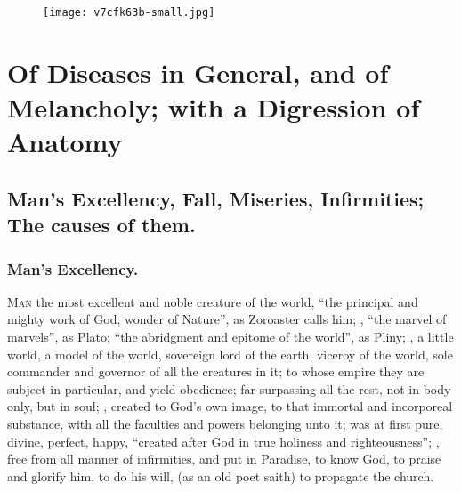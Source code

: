 \cleartoleftpage{}
\begin{figure}[p]
  \begingroup
  \centering
  \texttt{[image: v7cfk63b-small.jpg]}
  \label{fig:deathlooms}
\end{figure}
\clearpage{}
\chapter[Of Diseases and Melancholy]{Of Diseases in General, and of Melancholy; with a Digression of Anatomy}
\section[Man's Excellency, Fall, Miseries]{Man's Excellency, Fall, Miseries, Infirmities; The causes of them.}

\subsection{Man's Excellency.}

\lettrine[lines=4,findent=5pt,nindent=0pt]{M}{an} the most excellent and noble
creature of the world, \enquote{the principal and mighty work of God, wonder of
Nature}, as Zoroaster calls him; , \enquote{the
marvel of marvels}, as Plato; \enquote{the
abridgment and epitome of the world}, as Pliny;
, a little world, a model of the world,
sovereign lord of the earth, viceroy of the world, sole
commander and governor of all the creatures in it; to whose empire they are
subject in particular, and yield obedience; far surpassing all the rest, not in
body only, but in soul; ,
created to God's own image, to that
immortal and incorporeal substance, with all the faculties and powers belonging
unto it; was at first pure, divine, perfect, happy,
\enquote{created after God in true holiness and righteousness};
, free from all manner of infirmities, and put in Paradise,
to know God, to praise and glorify him, to do his will,  (as an old poet saith) to propagate the church.


